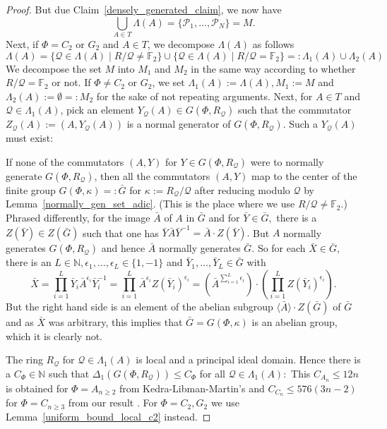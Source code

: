 \documentclass[12pt]{amsart}
\newcommand{\C}[1]{{\mathcal #1}}
\theoremstyle{definition}\newtheorem{definition}[theorem]{Definition}
\theoremstyle{remark}\newtheorem{remark}[theorem]{Remark}
\theoremstyle{definition}\newtheorem{case}{Case}
\begin{document}
\begin{proof}
But due Claim~\ref{densely_generated_claim}, we now have 
\[
\bigcup_{A\in T}\Lambda(A)=\{\C P_1,\dots,\C P_N\}=M.
\]
Next, if $\Phi=C_2$ or $G_2$ and $A\in T$, we decompose $\Lambda(A)$ as follows
\[
\Lambda(A)=\{\C Q\in\Lambda(A)\mid R/\C Q\neq\mathbb{F}_2\}\cup\{\C Q\in\Lambda(A)\mid R/\C Q=\mathbb{F}_2\}=:\Lambda_1(A)\cup\Lambda_2(A)
\]
We decompose the set $M$ into $M_1$ and $M_2$ in the same way according to whether $R/\C Q=\mathbb{F}_2$ or not. If $\Phi\neq C_2$ or $G_2$, we set $\Lambda_1(A):=\Lambda(A),M_1:=M$ and $\Lambda_2(A):=\emptyset=:M_2$ for the sake of not repeating arguments. Next, for $A\in T$ and $\C Q\in\Lambda_1(A)$, pick an element $Y_{\C Q}(A)\in G(\Phi,R_{\C Q})$ such that the commutator $Z_{\C Q}(A):=(A,Y_{\C Q}(A))$ is a normal generator of $G(\Phi,R_{\C Q})$. Such a $Y_{\C Q}(A)$ must exist:

If none of the commutators $(A,Y)$ for $Y\in G(\Phi,R_{\C Q})$ were to normally generate $G(\Phi,R_{\C Q})$, then all the commutators $(A,Y)$ map to the center of the finite group $G(\Phi,\kappa)=:\bar{G}$ for $\kappa:=R_{\C Q}/\C Q$ after reducing modulo $\C Q$ by Lemma~\ref{normally_gen_set_adic}. (This is the place where we use $R/\C Q\neq\mathbb{F}_2$.) Phrased differently, for the image $\bar{A}$ of $A$ in $\bar{G}$ and for $\bar{Y}\in\bar{G},$ there is a $Z(\bar{Y})\in Z(\bar{G})$ such that one has $\bar{Y}\bar{A}\bar{Y}^{-1}=\bar{A}\cdot Z(\bar{Y}).$ But $A$ normally generates $G(\Phi,R_{\C Q})$ and hence $\bar{A}$ normally generates $\bar{G}$. So for each $\bar{X}\in\bar{G}$, there is an $L\in\mathbb{N},\epsilon_1,\dots,\epsilon_L\in\{1,-1\}$ and $\bar{Y}_1,\dots,\bar{Y}_L\in\bar{G}$ with 
\[
\bar{X}=\prod_{i=1}^L\bar{Y}_i\bar{A}^{\epsilon_i}\bar{Y}_i^{-1}=\prod_{i=1}^L\bar{A}^{\epsilon_i}Z(\bar{Y}_i)^{\epsilon_i}=\left(\bar{A}^{\sum_{i=1}^L\epsilon_i}\right)\cdot \left(\prod_{i=1}^L Z(\bar{Y}_i)^{\epsilon_i}\right).
\]
But the right hand side is an element of the abelian subgroup $\langle \bar{A}\rangle\cdot Z(\bar{G})$ of $\bar{G}$ and as $\bar{X}$ was arbitrary, this implies that $\bar{G}=G(\Phi,\kappa)$ is an abelian group, which it is clearly not.

The ring $R_{\C Q}$ for $\C Q\in\Lambda_1(A)$ is local and a principal ideal domain. Hence there is a $C_{\Phi}\in\mathbb{N}$ such that $\Delta_1\left(G(\Phi,R_{\C Q})\right)\leq C_{\Phi}$ for all $\C Q\in\Lambda_1(A):$ This $C_{A_n}\leq 12n$ is obtained for $\Phi=A_{n\geq 2}$ from Kedra-Libman-Martin's \cite[Theorem~6.3]{KLM} and $C_{C_n}\leq 576(3n-2)$ for $\Phi=C_{n\geq 3}$ from our result \cite[Theorem~2]{explicit_strong_bound_sp_2n}. For $\Phi=C_2,G_2$ we use Lemma~\ref{uniform_bound_local_c2} instead.


\end{proof}
\end{document}

